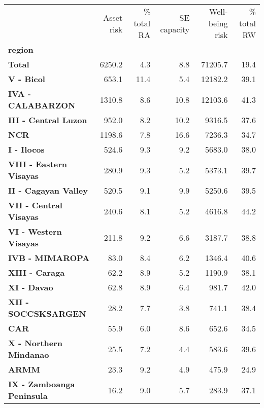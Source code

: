 \begin{tabular}{lrrrrr}
\toprule
{} &  Asset risk &  \% total RA &  SE capacity &  Well-being risk &  \% total RW \\
\textbf{region                  } &             &             &              &                  &             \\
\midrule
\textbf{Total                   } &      6250.2 &         4.3 &          8.8 &          71205.7 &        19.4 \\
\textbf{V - Bicol               } &       653.1 &        11.4 &          5.4 &          12182.2 &        39.1 \\
\textbf{IVA - CALABARZON        } &      1310.8 &         8.6 &         10.8 &          12103.6 &        41.3 \\
\textbf{III - Central Luzon     } &       952.0 &         8.2 &         10.2 &           9316.5 &        37.6 \\
\textbf{NCR                     } &      1198.6 &         7.8 &         16.6 &           7236.3 &        34.7 \\
\textbf{I - Ilocos              } &       524.6 &         9.3 &          9.2 &           5683.0 &        38.0 \\
\textbf{VIII - Eastern Visayas  } &       280.9 &         9.3 &          5.2 &           5373.1 &        39.7 \\
\textbf{II - Cagayan Valley     } &       520.5 &         9.1 &          9.9 &           5250.6 &        39.5 \\
\textbf{VII - Central Visayas   } &       240.6 &         8.1 &          5.2 &           4616.8 &        44.2 \\
\textbf{VI - Western Visayas    } &       211.8 &         9.2 &          6.6 &           3187.7 &        38.8 \\
\textbf{IVB - MIMAROPA          } &        83.0 &         8.4 &          6.2 &           1346.4 &        40.6 \\
\textbf{XIII - Caraga           } &        62.2 &         8.9 &          5.2 &           1190.9 &        38.1 \\
\textbf{XI - Davao              } &        62.8 &         8.9 &          6.4 &            981.7 &        42.0 \\
\textbf{XII - SOCCSKSARGEN      } &        28.2 &         7.7 &          3.8 &            741.1 &        38.4 \\
\textbf{CAR                     } &        55.9 &         6.0 &          8.6 &            652.6 &        34.5 \\
\textbf{X - Northern Mindanao   } &        25.5 &         7.2 &          4.4 &            583.6 &        39.6 \\
\textbf{ARMM                    } &        23.3 &         9.2 &          4.9 &            475.9 &        24.9 \\
\textbf{IX - Zamboanga Peninsula} &        16.2 &         9.0 &          5.7 &            283.9 &        37.1 \\
\bottomrule
\end{tabular}

